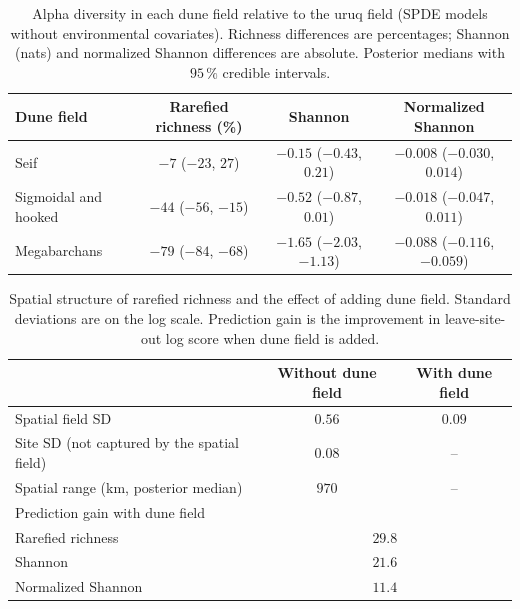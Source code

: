\documentclass[11pt]{article}
\begin{document}
\begin{table}[htbp]\centering\small
\caption{Alpha diversity in each dune field relative to the uruq field (SPDE models without environmental covariates). Richness differences are percentages; Shannon (nats) and normalized Shannon differences are absolute. Posterior medians with $95\,\%$ credible intervals.}\label{tab:dune_alpha}
\begin{tabular}{lccc}\toprule
Dune field & Rarefied richness (\%) & Shannon & Normalized Shannon \\\midrule
Seif & $-7$ ($-23$, $27$) & $-0.15$ ($-0.43$, $0.21$) & $-0.008$ ($-0.030$, $0.014$) \\
Sigmoidal and hooked & $-44$ ($-56$, $-15$) & $-0.52$ ($-0.87$, $0.01$) & $-0.018$ ($-0.047$, $0.011$) \\
Megabarchans & $-79$ ($-84$, $-68$) & $-1.65$ ($-2.03$, $-1.13$) & $-0.088$ ($-0.116$, $-0.059$) \\\bottomrule
\end{tabular}\end{table}

\begin{table}[htbp]\centering\small
\caption{Spatial structure of rarefied richness and the effect of adding dune field. Standard deviations are on the log scale. Prediction gain is the improvement in leave-site-out log score when dune field is added.}\label{tab:dune_cv}
\begin{tabular}{lcc}\toprule
 & Without dune field & With dune field \\\midrule
Spatial field SD & $0.56$ & $0.09$ \\
Site SD (not captured by the spatial field) & $0.08$ & -- \\
Spatial range (km, posterior median) & $970$ & -- \\\midrule
\multicolumn{3}{l}{Prediction gain with dune field} \\
\quad Rarefied richness & \multicolumn{2}{c}{$29.8$} \\
\quad Shannon & \multicolumn{2}{c}{$21.6$} \\
\quad Normalized Shannon & \multicolumn{2}{c}{$11.4$} \\\bottomrule
\end{tabular}\end{table}
\end{document}
